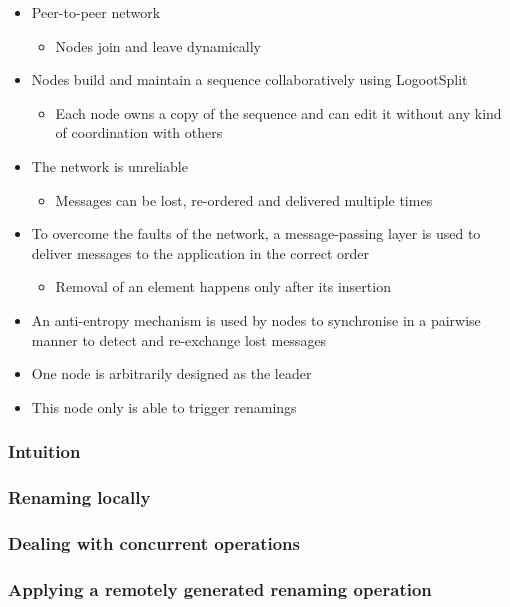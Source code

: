 \documentclass{article}
\begin{document}
\begin{itemize}
    \item Peer-to-peer network
    \begin{itemize}
        \item Nodes join and leave dynamically
    \end{itemize}
    \item Nodes build and maintain a sequence collaboratively using LogootSplit
    \begin{itemize}
        \item Each node owns a copy of the sequence and can edit it without any kind of coordination with others
    \end{itemize}
    \item The network is unreliable
    \begin{itemize}
        \item Messages can be lost, re-ordered and delivered multiple times
    \end{itemize}
    \item To overcome the faults of the network, a message-passing layer is used to deliver messages to the application in the correct order
    \begin{itemize}
        \item Removal of an element happens only after its insertion
    \end{itemize}
    \item An anti-entropy mechanism is used by nodes to synchronise in a pairwise manner to detect and re-exchange lost messages

    \item One node is arbitrarily designed as the leader
    \item This node only is able to trigger renamings
\end{itemize}

\subsubsection{Intuition}
\subsubsection{Renaming locally}
\subsubsection{Dealing with concurrent operations}
\subsubsection{Applying a remotely generated renaming operation}
\end{document}

